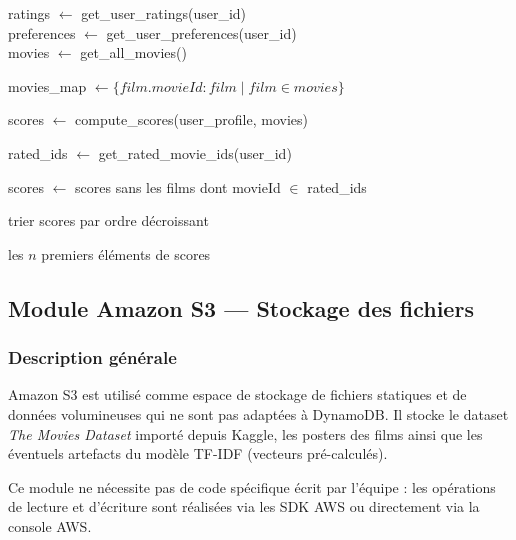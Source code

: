 \documentclass[a4paper,12pt]{report}
\begin{document}
\begin{algorithm}
\caption{get\_recommendations}

ratings $\leftarrow$ get\_user\_ratings(user\_id)\\
preferences $\leftarrow$ get\_user\_preferences(user\_id)\\
movies $\leftarrow$ get\_all\_movies()

movies\_map $\leftarrow \{ film.movieId : film \mid film \in movies \}$


scores $\leftarrow$ compute\_scores(user\_profile, movies)

rated\_ids $\leftarrow$ get\_rated\_movie\_ids(user\_id)

scores $\leftarrow$ scores sans les films dont movieId $\in$ rated\_ids

trier scores par ordre décroissant

\Return les $n$ premiers éléments de scores
\end{algorithm}

\newpage

\subsection{Module Amazon S3 — Stockage des fichiers}
\label{s3}
\subsubsection{Description générale}

Amazon S3 est utilisé comme espace de stockage de fichiers statiques et de données volumineuses qui ne sont pas adaptées à DynamoDB. Il stocke le dataset \textit{The Movies Dataset} importé depuis Kaggle, les posters des films ainsi que les éventuels artefacts du modèle TF-IDF (vecteurs pré-calculés).

Ce module ne nécessite pas de code spécifique écrit par l'équipe : les opérations de lecture et d'écriture sont réalisées via les SDK AWS ou directement via la console AWS.
\end{document}
